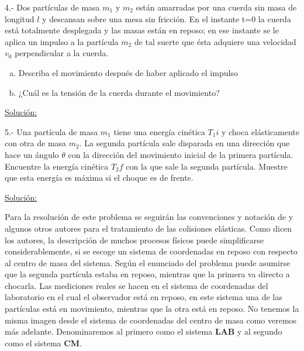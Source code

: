 \documentclass[a4paper,10pt]{article}
\begin{document}
\vspace{.3cm}

4.- Dos partículas de masa $m_1$ y $m_2$ están amarradas por una cuerda sin masa de 
longitud $l$ y descansan sobre una mesa sin fricción. En el instante t=0 la cuerda
está totalmente desplegada y las masas están en reposo; en ese instante se le aplica
un impulso a la partícula $m_2$ de tal suerte que ésta adquiere una velocidad $v_0$ 
perpendicular a la cuerda.

\begin{enumerate}[a)]
 \item Describa el movimiento después de haber aplicado el impulso
 \item ¿Cuál es la tensión de la cuerda durante el movimiento?
\end{enumerate}

\vspace{.3cm}

\underline{Solución:}

\vspace{.3cm}

5.- Una partícula de masa $m_1$ tiene una energía cinética $T_1i$ y choca elásticamente 
con otra de masa $m_2$. La segunda partícula sale disparada en una dirección que hace un
ángulo $\theta$ con la dirección del movimiento inicial de la primera partícula. Encuentre
la energía cinética $T_2f$ con la que sale la segunda partícula. Muestre que esta energía
es máxima si el choque es de frente.

\vspace{.3cm}

\underline{Solución:}

\vspace{.3cm}

Para la resolución de este problema se seguirán las convenciones y notación de \cite{marion} y algunos
otros autores para el tratamiento de las colisiones elásticas. Como dicen los autores, 
la descripción de muchos procesos físicos puede simplificarse considerablemente, si se 
escoge un sistema de coordenadas en reposo con respecto al centro de masa del sistema. Según
el enunciado del problema puede asumirse que la segunda partícula estaba en reposo, mientras
que la primera va directo a chocarla. Las mediciones reales se hacen en el sistema de coordenadas
del laboratorio en el cual el observador está en reposo, en este sistema una de las partículas
está en movimiento, mientras que la otra está en reposo. No tenemos la misma imagen desde el
sistema de coordenadas del centro de masa como veremos más adelante. Denominaremos al primero como el sistema \textbf{LAB}
y al segundo como el sistema \textbf{CM}.
\end{document}
